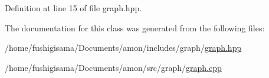 Definition at line 15 of file graph.\-hpp.



The documentation for this class was generated from the following files\-:\begin{DoxyCompactItemize}
\item 
/home/fushigisama/\-Documents/amon/includes/graph/\hyperlink{graph_8hpp}{graph.\-hpp}\item 
/home/fushigisama/\-Documents/amon/src/graph/\hyperlink{graph_8cpp}{graph.\-cpp}\end{DoxyCompactItemize}
